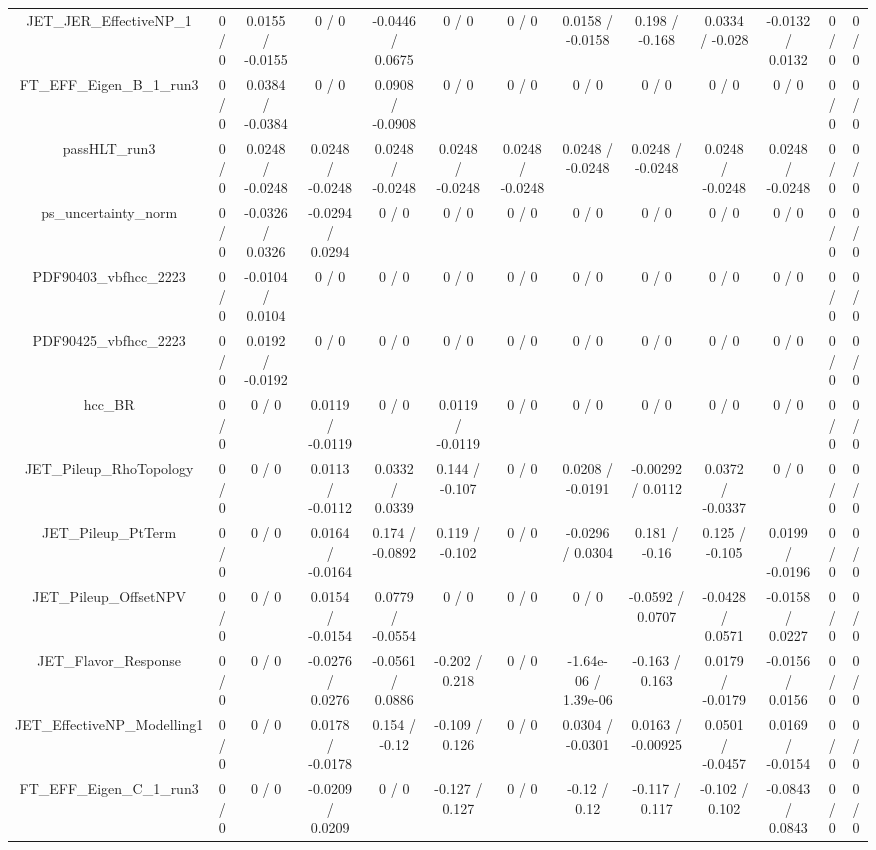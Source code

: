 \documentclass[10pt]{article}
\begin{document}
\begin{table}[htbp]
\begin{center}
\begin{tabular}{|c|c|c|c|c|c|c|c|c|c|c|c|c|}
  JET_JER_EffectiveNP_1 & 0 / 0 & 0.0155 / -0.0155 & 0 / 0 & -0.0446 / 0.0675 & 0 / 0 & 0 / 0 & 0.0158 / -0.0158 & 0.198 / -0.168 & 0.0334 / -0.028 & -0.0132 / 0.0132 & 0 / 0 & 0 / 0 \\ 
  FT_EFF_Eigen_B_1_run3 & 0 / 0 & 0.0384 / -0.0384 & 0 / 0 & 0.0908 / -0.0908 & 0 / 0 & 0 / 0 & 0 / 0 & 0 / 0 & 0 / 0 & 0 / 0 & 0 / 0 & 0 / 0 \\ 
  passHLT_run3 & 0 / 0 & 0.0248 / -0.0248 & 0.0248 / -0.0248 & 0.0248 / -0.0248 & 0.0248 / -0.0248 & 0.0248 / -0.0248 & 0.0248 / -0.0248 & 0.0248 / -0.0248 & 0.0248 / -0.0248 & 0.0248 / -0.0248 & 0 / 0 & 0 / 0 \\ 
  ps_uncertainty_norm & 0 / 0 & -0.0326 / 0.0326 & -0.0294 / 0.0294 & 0 / 0 & 0 / 0 & 0 / 0 & 0 / 0 & 0 / 0 & 0 / 0 & 0 / 0 & 0 / 0 & 0 / 0 \\ 
  PDF90403_vbfhcc_2223 & 0 / 0 & -0.0104 / 0.0104 & 0 / 0 & 0 / 0 & 0 / 0 & 0 / 0 & 0 / 0 & 0 / 0 & 0 / 0 & 0 / 0 & 0 / 0 & 0 / 0 \\ 
  PDF90425_vbfhcc_2223 & 0 / 0 & 0.0192 / -0.0192 & 0 / 0 & 0 / 0 & 0 / 0 & 0 / 0 & 0 / 0 & 0 / 0 & 0 / 0 & 0 / 0 & 0 / 0 & 0 / 0 \\ 
  hcc_BR & 0 / 0 & 0 / 0 & 0.0119 / -0.0119 & 0 / 0 & 0.0119 / -0.0119 & 0 / 0 & 0 / 0 & 0 / 0 & 0 / 0 & 0 / 0 & 0 / 0 & 0 / 0 \\ 
  JET_Pileup_RhoTopology & 0 / 0 & 0 / 0 & 0.0113 / -0.0112 & 0.0332 / 0.0339 & 0.144 / -0.107 & 0 / 0 & 0.0208 / -0.0191 & -0.00292 / 0.0112 & 0.0372 / -0.0337 & 0 / 0 & 0 / 0 & 0 / 0 \\ 
  JET_Pileup_PtTerm & 0 / 0 & 0 / 0 & 0.0164 / -0.0164 & 0.174 / -0.0892 & 0.119 / -0.102 & 0 / 0 & -0.0296 / 0.0304 & 0.181 / -0.16 & 0.125 / -0.105 & 0.0199 / -0.0196 & 0 / 0 & 0 / 0 \\ 
  JET_Pileup_OffsetNPV & 0 / 0 & 0 / 0 & 0.0154 / -0.0154 & 0.0779 / -0.0554 & 0 / 0 & 0 / 0 & 0 / 0 & -0.0592 / 0.0707 & -0.0428 / 0.0571 & -0.0158 / 0.0227 & 0 / 0 & 0 / 0 \\ 
  JET_Flavor_Response & 0 / 0 & 0 / 0 & -0.0276 / 0.0276 & -0.0561 / 0.0886 & -0.202 / 0.218 & 0 / 0 & -1.64e-06 / 1.39e-06 & -0.163 / 0.163 & 0.0179 / -0.0179 & -0.0156 / 0.0156 & 0 / 0 & 0 / 0 \\ 
  JET_EffectiveNP_Modelling1 & 0 / 0 & 0 / 0 & 0.0178 / -0.0178 & 0.154 / -0.12 & -0.109 / 0.126 & 0 / 0 & 0.0304 / -0.0301 & 0.0163 / -0.00925 & 0.0501 / -0.0457 & 0.0169 / -0.0154 & 0 / 0 & 0 / 0 \\ 
  FT_EFF_Eigen_C_1_run3 & 0 / 0 & 0 / 0 & -0.0209 / 0.0209 & 0 / 0 & -0.127 / 0.127 & 0 / 0 & -0.12 / 0.12 & -0.117 / 0.117 & -0.102 / 0.102 & -0.0843 / 0.0843 & 0 / 0 & 0 / 0 \\ 

\end{tabular}
\end{center}
\end{table}
\end{document}
